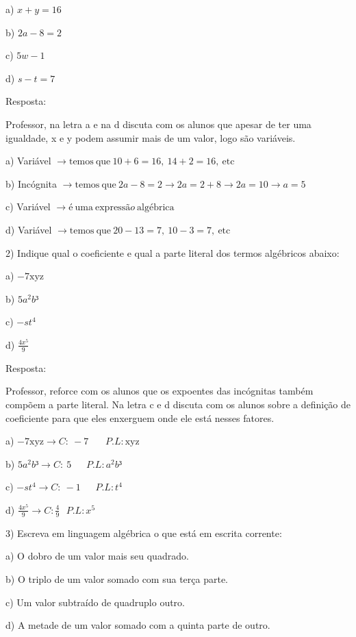 a) \(x + y = 16\)

b) \(2a - 8 = 2\)

c) \(5w - 1\)

d) \(s - t = 7\)

Resposta:

Professor, na letra a e na d discuta com os alunos que apesar de ter uma
igualdade, x e y podem assumir mais de um valor, logo são variáveis.

a) Variável
\(\rightarrow \text{temos}\ \text{que}\ 10 + 6 = 16,\ 14 + 2 = 16,\ \text{etc}\)

b) Incógnita
\(\rightarrow \text{temos}\ \text{que}\ 2a - 8 = 2 \rightarrow 2a = 2 + 8 \rightarrow 2a = 10 \rightarrow a = 5\)

c) Variável
\(\rightarrow é\ \text{uma}\ \text{express}ão\ \text{alg}é\text{brica}\)

d) Variável
\(\rightarrow \text{temos}\ \text{que}\ 20 - 13 = 7,\ 10 - 3 = 7,\ \text{etc}\)

2) Indique qual o coeficiente e qual a parte literal dos termos
algébricos abaixo:

a) \(- 7\text{xyz}\)

b) \(5a^2b³\)

c) \(- st^{4}\)

d) \(\frac{4x^{5}}{9}\)

Resposta:

Professor, reforce com os alunos que os expoentes das incógnitas também
compõem a parte literal. Na letra c e d discuta com os alunos sobre a
definição de coeficiente para que eles enxerguem onde ele está nesses
fatores.

a) \(- 7\text{xyz} \rightarrow C:\  - 7\ \ \ \ \ \ \ \ P.L:\text{xyz}\)

b) \(5a^2b³ \rightarrow C:\ 5\ \ \ \ \ \ \ P.L:a^2b³\)

c) \(- st^{4} \rightarrow C:\  - 1\ \ \ \ \ \ \ P.L:t^{4}\)

d)
\(\frac{4x^{5}}{9} \rightarrow C:\frac{4}{9}\text{\ \ \ \ \ \ \ }P.L:x^{5}\)

3) Escreva em linguagem algébrica o que está em escrita corrente:

a) O dobro de um valor mais seu quadrado.

b) O triplo de um valor somado com sua terça parte.

c) Um valor subtraído de quadruplo outro.

d) A metade de um valor somado com a quinta parte de outro.


